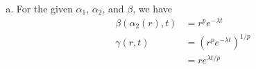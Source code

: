 \documentclass{homework}
\begin{document}
\begin{enumerate}[(a)]
Thus, since $\alpha_1$ is class-$\mathcal{K}$
\begin{equation*}
    \gamma(r, t_1) = \alpha_1(s_1) > \alpha_1(s_2) = \gamma(r, t_2)
\end{equation*}
and $\gamma$ is strictly decreasing.

Finally, since for any $r > 0$, $\beta(r, t) \to 0$ as $t \to \infty$, we have
\begin{equation*}
    \lim_{t \to \infty} \gamma(r, t) = \lim_{t \to \infty} \alpha(\beta(\alpha_2(r), t))
        = \alpha_1(0) = 0
\end{equation*}

\item For the given $\alpha_1$, $\alpha_2$, and $\beta$, we have
\begin{align*}
    \beta(\alpha_2(r), t) &= r^p e^{-\lambda t} \\
    \gamma(r, t) &= (r^p e^{-\lambda t})^{1/p} \\ &= r e^{\lambda t / p}
\end{align*}


\end{enumerate}
\end{document}
